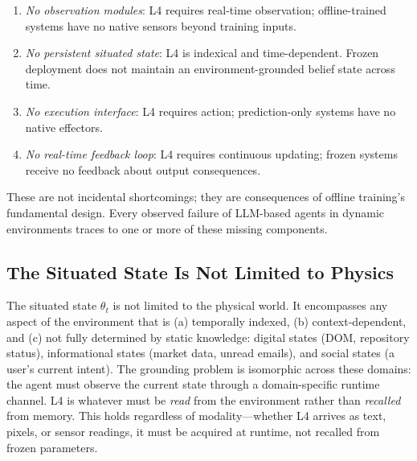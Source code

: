 \begin{enumerate}
\item \emph{No observation modules}: L4 requires real-time observation; offline-trained systems have no native sensors beyond training inputs.

\item \emph{No persistent situated state}: L4 is indexical and time-dependent. Frozen deployment does not maintain an environment-grounded belief state across time.

\item \emph{No execution interface}: L4 requires action; prediction-only systems have no native effectors.

\item \emph{No real-time feedback loop}: L4 requires continuous updating; frozen systems receive no feedback about output consequences.
\end{enumerate}

These are not incidental shortcomings; they are consequences of offline training's fundamental design. Every observed failure of LLM-based agents in dynamic environments traces to one or more of these missing components.

\subsection{The Situated State Is Not Limited to Physics}

The situated state \(\theta_t\) is not limited to the physical world. It encompasses any aspect of the environment that is (a) temporally indexed, (b) context-dependent, and (c) not fully determined by static knowledge: digital states (DOM, repository status), informational states (market data, unread emails), and social states (a user's current intent). The grounding problem is isomorphic across these domains: the agent must observe the current state through a domain-specific runtime channel. L4 is whatever must be \emph{read} from the environment rather than \emph{recalled} from memory. This holds regardless of modality---whether L4 arrives as text, pixels, or sensor readings, it must be acquired at runtime, not recalled from frozen parameters.

